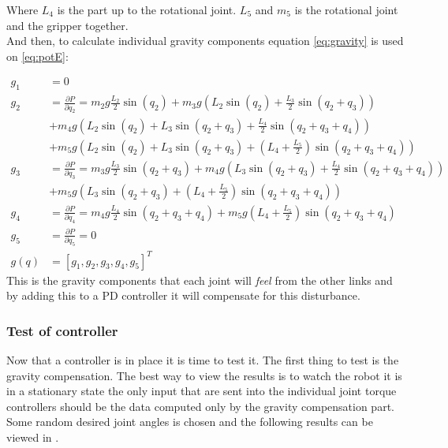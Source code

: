  Where $L_4$ is the part up to the rotational joint. $L_5$ and $m_5$ is the rotational joint and the gripper together.  \\
 
 And then, to calculate individual gravity components equation \eqref{eq:gravity} is used on \eqref{eq:potE}:

 \begin{align*}
    g_1 &= 0
    \\
    g_2 &= \frac{\partial P}{\partial q_2} = 
    m_2g\frac{L_2}{2}\sin{(q_2)}+
    m_3g\left( L_2 \sin{(q_2)} + \frac{L_3}{2}\sin{(q_2+q_3)} \right)\\&+
    m_4g\left( L_2 \sin{(q_2)} + L_3\sin{(q_2 + q_3)} + \frac{L_4}{2}\sin{(q_2+q_3+q_4)} \right)\\&+
    m_5g\left( L_2 \sin{(q_2)} + L_3\sin{(q_2 + q_3)} + \left(L_4 + \frac{L_5}{2} \right)\sin{(q_2+q_3+q_4)} \right)
    \\
    g_3 &= \frac{\partial P}{\partial q_3} =
    m_3g\frac{L_3}{2}\sin{(q_2+q_3)} +
    m_4g\left( L_3\sin{(q_2 + q_3)} + \frac{L_4}{2}\sin{(q_2+q_3+q_4)} \right)\\&+
    m_5g\left(  L_3\sin{(q_2 + q_3)} + \left(L_4 + \frac{L_5}{2} \right)\sin{(q_2+q_3+q_4)} \right)
    \\
    g_4 &=\frac{\partial P}{\partial q_4} = 
    m_4g\frac{L_4}{2}\sin{(q_2+q_3+q_4)}+
    m_5g\left(L_4 + \frac{L_5}{2} \right)\sin{(q_2+q_3+q_4)}
    \\
    g_5 &= \frac{\partial P}{\partial q_5} = 0
    \\
    g(q) &= [g_1,g_2,g_3,g_4,g_5]^T
 \end{align*}
This is the gravity components that each joint will \textit{feel} from the other links and by adding this to a PD controller it will compensate for this disturbance. 

\subsubsection{Test of controller}
Now that a controller is in place it is time to test it. The first thing to test is the gravity compensation. The best way to view the results is to watch the robot it is in a stationary state the only input that are sent into the individual joint torque controllers should be the data computed only by the gravity compensation part. Some random desired joint angles is chosen and the following results can be viewed in .\\

